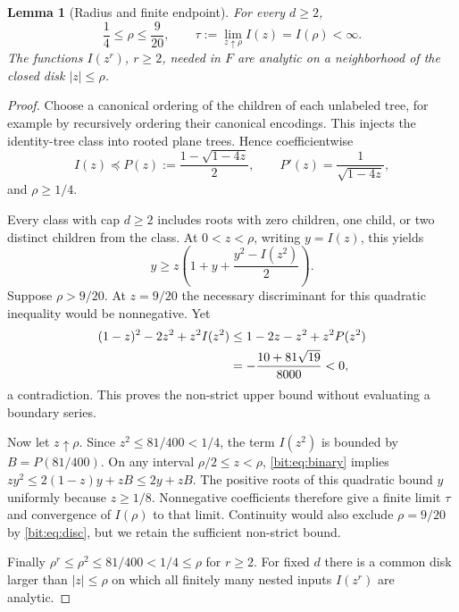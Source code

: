 \documentclass[11pt]{article}
\newtheorem{lemma}[theorem]{Lemma}
\theoremstyle{definition}\newtheorem{definition}[theorem]{Definition}
\theoremstyle{remark}\newtheorem{remark}[theorem]{Remark}
\begin{document}
\begin{lemma}[Radius and finite endpoint]
\label{bit:lem:radius}
For every $d\ge2$,
\begin{equation}
 \frac14\le\rho\le\frac9{20},\qquad
 \tau:=\lim_{z\uparrow\rho} I(z)=I(\rho)<\infty.
 \label{bit:eq:bounds}
\end{equation}
The functions $I(z^r)$, $r\ge2$, needed in $F$ are analytic on a neighborhood of the closed disk $|z|\le\rho$.
\end{lemma}
\begin{proof}
Choose a canonical ordering of the children of each unlabeled tree, for example by recursively ordering their canonical encodings. This injects the identity-tree class into rooted plane trees. Hence coefficientwise
\begin{equation}
 I(z)\preceq P(z):=\frac{1-\sqrt{1-4z}}2,\qquad
 P'(z)=\frac1{\sqrt{1-4z}},
 \label{bit:eq:plane}
\end{equation}
and $\rho\ge1/4$.

Every class with cap $d\ge2$ includes roots with zero children, one child, or two distinct children from the class. At $0<z<\rho$, writing $y=I(z)$, this yields
\begin{equation}
 y\ge z\left(1+y+\frac{y^2-I(z^2)}2\right).
 \label{bit:eq:binary}
\end{equation}
Suppose $\rho>9/20$. At $z=9/20$ the necessary discriminant for this quadratic inequality would be nonnegative. Yet
\begin{align}
 (1-z)^2-2z^2+z^2I(z^2)
 &\le 1-2z-z^2+z^2P(z^2)\notag\\
 &=-\frac{10+81\sqrt{19}}{8000}<0,
 \label{bit:eq:disc}
\end{align}
a contradiction. This proves the non-strict upper bound without evaluating a boundary series.

Now let $z\uparrow\rho$. Since $z^2\le81/400<1/4$, the term $I(z^2)$ is bounded by $B=P(81/400)$. On any interval $\rho/2\le z<\rho$, \eqref{bit:eq:binary} implies
$zy^2\le2(1-z)y+zB\le2y+zB$.
The positive roots of this quadratic bound $y$ uniformly because $z\ge1/8$. Nonnegative coefficients therefore give a finite limit $\tau$ and convergence of $I(\rho)$ to that limit. Continuity would also exclude $\rho=9/20$ by \eqref{bit:eq:disc}, but we retain the sufficient non-strict bound.

Finally $\rho^r\le\rho^2\le81/400<1/4\le\rho$ for $r\ge2$. For fixed $d$ there is a common disk larger than $|z|\le\rho$ on which all finitely many nested inputs $I(z^r)$ are analytic.
\end{proof}
\end{document}
